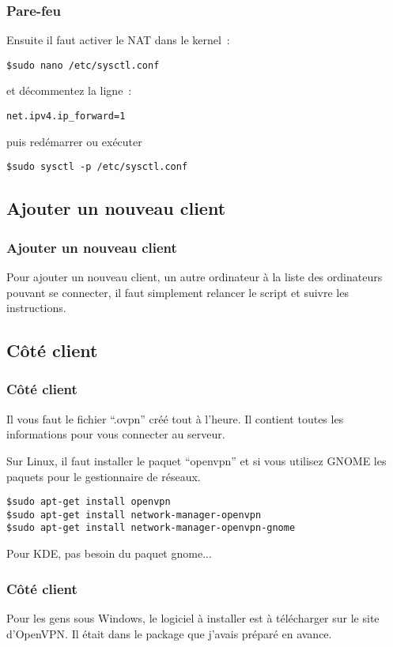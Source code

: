 \begin{frame}[containsverbatim]
\frametitle{Pare-feu}

Ensuite il faut activer le NAT dans le kernel~:
\begin{verbatim}
$sudo nano /etc/sysctl.conf
\end{verbatim}

et décommentez la ligne~:

\begin{verbatim}
net.ipv4.ip_forward=1
\end{verbatim}

puis redémarrer ou exécuter

\begin{verbatim}
$sudo sysctl -p /etc/sysctl.conf
\end{verbatim}

\end{frame}

\subsection{Ajouter un nouveau client}

\begin{frame}[containsverbatim]
\frametitle{Ajouter un nouveau client}
Pour ajouter un nouveau client, un autre ordinateur à la liste des ordinateurs pouvant se connecter, il faut simplement relancer le script et suivre les instructions.

\end{frame}


\subsection{Côté client}
\frametitle{Côté client}
\begin{frame}[containsverbatim]
Il vous faut le fichier ``.ovpn'' créé tout à l'heure. Il contient toutes les informations pour vous connecter au serveur.

Sur Linux, il faut installer le paquet ``openvpn'' et si vous utilisez GNOME les paquets pour le gestionnaire de réseaux.

\begin{verbatim}
$sudo apt-get install openvpn 
$sudo apt-get install network-manager-openvpn
$sudo apt-get install network-manager-openvpn-gnome
\end{verbatim}

Pour KDE, pas besoin du paquet gnome...

\end{frame}

\begin{frame}[containsverbatim]
\frametitle{Côté client}
Pour les gens sous Windows, le logiciel à installer est à télécharger sur le site d'OpenVPN. Il était dans le package que j'avais préparé en avance.
\end{frame}